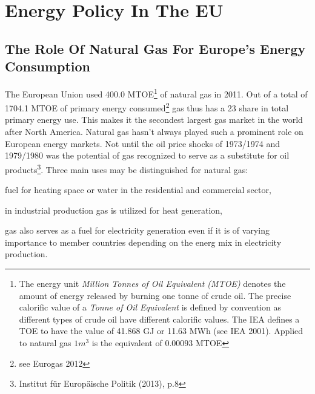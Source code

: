 \documentclass[11pt,a4paper,english]{scrreprt}
\begin{document}

	
	
	
  \chapter{Energy Policy In The EU}
 
 
    \section{The Role Of Natural Gas For Europe's Energy Consumption}


The European Union used 400.0 MTOE\footnote{\textcolor{dunkelgrau.80}{The energy
unit \emph{Million Tonnes of Oil Equivalent (MTOE)} denotes the amount of energy
released by burning one tonne of crude oil. The precise calorific value of a
\emph{Tonne of Oil Equivalent} is defined by convention as different types of
crude oil have different calorific values. The IEA defines a TOE to have the
value of 41.868 GJ or 11.63 MWh (see IEA 2001). Applied to natural gas $1{}
m^{3}$ is the equivalent of $0.00093$ MTOE}} of natural gas in 2011. Out of a
total of 1704.1 MTOE of primary energy consumed\footnote{see Eurogas 2012} gas
thus has a 23 \textdiscount{} share in total primary energy use. This makes it
the secondest largest gas market in the world after North America. Natural gas
hasn't always played such a prominent role on European energy markets. Not until
the oil price shocks of 1973/1974 and 1979/1980 was the potential of gas
recognized to serve as a substitute for oil products\footnote{Institut f\"ur
Europ\"aische Politik (2013), p.8}. Three main uses may be distinguished for
natural gas:
  \begin{inparaenum}[(1)] \item fuel for heating space or water in the
residential and commercial sector, \item in industrial production gas is
utilized for heat generation, \item gas also serves as a fuel for electricity
generation even if it is of varying importance to member countries depending on
the energ mix in electricity production.\end{inparaenum} \par
\end{document}
